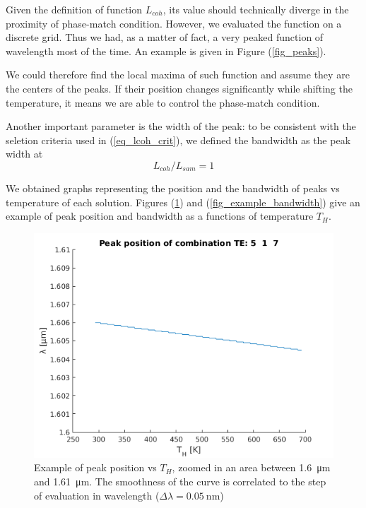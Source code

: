 \documentclass[12pt,a4paper,twoside]{article}
\begin{document}
Given the definition of function $L_{coh}$, its value should technically diverge in the proximity of phase-match condition.
However, we evaluated the function on a discrete grid.
Thus we had, as a matter of fact, a very peaked function of wavelength most of the time.
An example is given in Figure (\ref{fig_peaks}).

We could therefore find the local maxima of such function and assume they are the centers of the peaks.
If their position changes significantly while shifting the temperature, it means we are able to control the phase-match condition.

Another important parameter is the width of the peak: to be consistent with the seletion criteria used in (\ref{eq_lcoh_crit}), we defined the bandwidth as the peak width at
$$L_{coh}/L_{sam} = 1$$

We obtained graphs representing the position and the bandwidth of peaks vs temperature of each solution.
Figures (\ref{fig_example_position}) and (\ref{fig_example_bandwidth}) give an example of peak position and bandwidth as a functions of temperature $T_H$.
\begin{figure}[!ht]
	\centering
	\includegraphics[width=.75\textwidth]{ex_pos.png}
	\caption{Example of peak position vs $T_H$, zoomed in an area between \SI{1.6}{\um} and \SI{1.61}{\um}. The smoothness of the curve is correlated to the step of evaluation in wavelength ($\Delta \lambda = \SI{0.05}{\nm}$)}
	\label{fig_example_position}
\end{figure}
\end{document}
